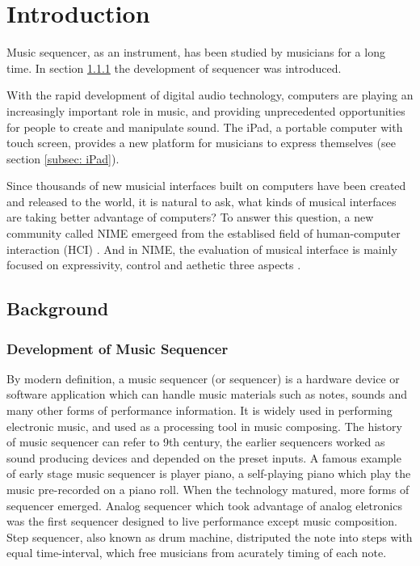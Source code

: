 \pagestyle{fancy}
\rhead{\thepage}
\chapter{Introduction}
Music sequencer, as an instrument, has been studied by musicians for a long time. In section \ref{subsec: history} the development of sequencer was introduced.

With the rapid development of digital audio technology, computers are playing an increasingly important role in music, and providing unprecedented opportunities for people to create and manipulate sound. The iPad, a portable computer with touch screen, provides a new platform for musicians to express themselves (see section \ref{subsec: iPad}).

Since thousands of new musicial interfaces built on computers have been created and released to the world, it is natural to ask, what kinds of musical interfaces are taking better advantage of computers? To answer this question, a new community called NIME emergeed from the establised field of human-computer interaction (HCI) \citep{Reference16}. And in NIME, the evaluation of musical interface is mainly focused on expressivity, control and aethetic three aspects \citep{Reference0}. 

\section{Background}
\label{sec: backgound}

\subsection{Development of Music Sequencer}
\label{subsec: history}
By modern definition, a music sequencer (or sequencer) is a hardware device or software application which can handle music materials such as notes, sounds and many other forms of performance information. It is widely used in performing electronic music, and used as a processing tool in music composing. The history of music sequencer can refer to 9th century, the earlier sequencers worked as sound producing devices and depended on the preset inputs. A famous example of early stage music sequencer is player piano, a self-playing piano which play the music pre-recorded on a piano roll. When the technology matured, more forms of sequencer emerged. Analog sequencer which took advantage of analog eletronics was the first sequencer designed to live performance except music composition. Step sequencer, also known as drum machine, distriputed the note into steps with equal time-interval, which free musicians from acurately timing of each note.

